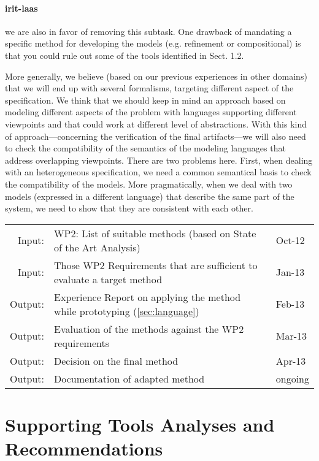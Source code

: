 \documentclass[11pt, a4paper]{article}
\newenvironment{inoutput}
{\vspace{2mm}
\noindent
\begin{tabular}{|r|p{.7\linewidth}|l|}
\hline}
{
\hline
\end{tabular}}
\begin{document}
\paragraph{irit-laas} we are also in favor of removing this
subtask. One drawback of mandating a specific method for developing
the models (e.g. refinement or compositional) is that you could rule
out some of the tools identified in Sect. 1.2.

More generally, we believe (based on our previous experiences in other
domains) that we will end up with several formalisms, targeting
different aspect of the specification. We think that we should keep in
mind an approach based on modeling different aspects of the problem
with languages supporting different viewpoints and that could work at
different level of abstractions. With this kind of
approach---concerning the verification of the final artifacts---we
will also need to check the compatibility of the semantics of the
modeling languages that address overlapping viewpoints. There are two
problems here. First, when dealing with an heterogeneous
specification, we need a common semantical basis to check the
compatibility of the models. More pragmatically, when we deal with two
models (expressed in a different language) that describe the same part
of the system, we need to show that they are consistent with each
other.


\begin{inoutput}
Input: & WP2: List of suitable methods (based on State of the Art Analysis) & Oct-12 \\
Input: & Those WP2 Requirements that are sufficient to evaluate a target method & Jan-13 \\
\hline
Output: & Experience Report on applying the method while prototyping (\ref{sec:language}) & Feb-13 \\
Output: & Evaluation of the methods against the WP2 requirements & Mar-13 \\
Output: & Decision on the final method & Apr-13 \\
Output: & Documentation of adapted method & ongoing \\
\end{inoutput}

\section{Supporting Tools Analyses and Recommendations}
\label{sec:supporting_tools}
\end{document}
